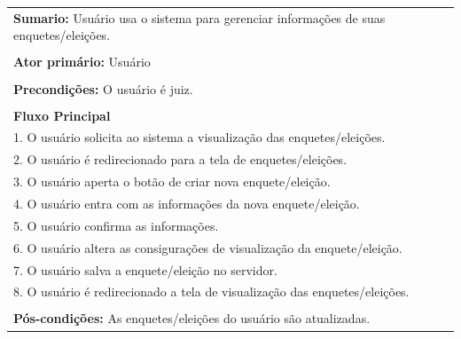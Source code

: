 \documentclass[a4paper,12pt]{article}
\begin{document}
\begin{tabular}{|l|}\hline
	{\textbf{Sumario:}} Usuário usa o sistema para gerenciar informações de suas enquetes/eleições.\ \ \ \ \ \ \ \ \ \ \\\\
	{\textbf{Ator primário:}} Usuário \\\\
	{\textbf{Precondições:}} O usuário é juiz.\\\\
	{\textbf{Fluxo Principal}}\\
	1. O usuário solicita ao sistema a visualização das enquetes/eleições.\\
	2. O usuário é redirecionado para a tela de enquetes/eleições. \\
	3. O usuário aperta o botão de criar nova enquete/eleição. \\
	4. O usuário entra com as informações da nova enquete/eleição.\\
	5. O usuário confirma as informações.\\
	6. O usuário altera as consigurações de visualização da enquete/eleição.\\
	7. O usuário salva a enquete/eleição no servidor.\\
	8. O usuário é redirecionado a tela de visualização das enquetes/eleições.\\\\
	{\textbf{Pós-condições:}} As enquetes/eleições do usuário são atualizadas.\\
	\hline
\end{tabular}
\end{document}
